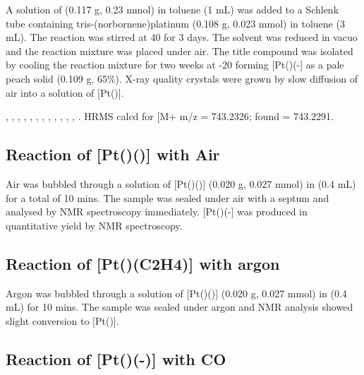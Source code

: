 A solution of \tButhixantphos{} (0.117 g, 0.23 mmol) in toluene (1 mL) was added to a Schlenk tube containing tris-(norbornene)platinum (0.108 g, 0.023 mmol) in toluene (3 mL).  The reaction was stirred at 40 \degC{} for 3 days.  The solvent was reduced in vacuo and the reaction mixture was placed under air.  The title compound was isolated by cooling the reaction mixture for two weeks at -20 \degC{} forming [Pt(\tButhixantphos)(-] as a pale peach solid (0.109 g, 65\%).  X-ray quality crystals were grown by slow diffusion of air into a  solution of [Pt(\tButhixantphos)].

,
,
,
,
,
,
,
,
,
,
,
,
.
HRMS calcd for  [M+\ce{H]+} m/z = 743.2326; found = 743.2291.

\subsection*{Reaction of \texorpdfstring{[Pt(\tButhixantphos)()]} P with Air}
Air was bubbled through a solution of [Pt(\tButhixantphos)()] (0.020 g, 0.027 mmol) in  (0.4 mL) for a total of 10 mins.  The sample was sealed under air with a septum and analysed by NMR spectroscopy immediately.  [Pt(\tButhixantphos)(-] was produced in quantitative yield by NMR spectroscopy.  

\subsection*{Reaction of \texorpdfstring{[Pt(\tButhixantphos)(C2H4)]} P with argon}
Argon was bubbled through a solution of [Pt(\tButhixantphos)()] (0.020 g, 0.027 mmol) in  (0.4 mL) for 10 mins.  The sample was sealed under argon and NMR analysis showed slight conversion to [Pt(\tButhixantphos)].  

\subsection*{Reaction of \texorpdfstring{[Pt(\tButhixantphos)(-)]} P with CO}

